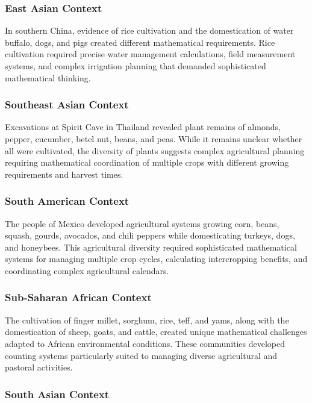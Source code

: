 \documentclass[12pt, oneside, openany]{book}
\begin{document}
\subsubsection{East Asian Context}

In southern China, evidence of rice cultivation and the domestication of water buffalo, dogs, and pigs created different mathematical requirements. Rice cultivation required precise water management calculations, field measurement systems, and complex irrigation planning that demanded sophisticated mathematical thinking.

\subsubsection{Southeast Asian Context}

Excavations at Spirit Cave in Thailand revealed plant remains of almonds, pepper, cucumber, betel nut, beans, and peas. While it remains unclear whether all were cultivated, the diversity of plants suggests complex agricultural planning requiring mathematical coordination of multiple crops with different growing requirements and harvest times.

\subsubsection{South American Context}

The people of Mexico developed agricultural systems growing corn, beans, squash, gourds, avocados, and chili peppers while domesticating turkeys, dogs, and honeybees. This agricultural diversity required sophisticated mathematical systems for managing multiple crop cycles, calculating intercropping benefits, and coordinating complex agricultural calendars.

\subsubsection{Sub-Saharan African Context}

The cultivation of finger millet, sorghum, rice, teff, and yams, along with the domestication of sheep, goats, and cattle, created unique mathematical challenges adapted to African environmental conditions. These communities developed counting systems particularly suited to managing diverse agricultural and pastoral activities.

\subsubsection{South Asian Context}
\end{document}
